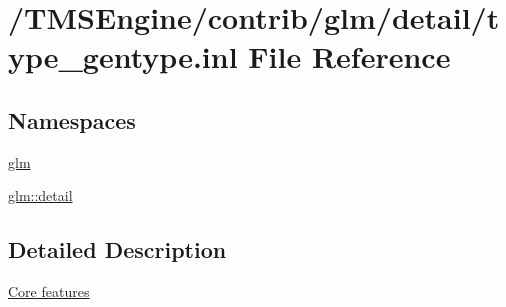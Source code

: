 \hypertarget{type__gentype_8inl}{}\section{/\+T\+M\+S\+Engine/contrib/glm/detail/type\+\_\+gentype.inl File Reference}
\label{type__gentype_8inl}
\subsection*{Namespaces}
\begin{DoxyCompactItemize}
\item 
 \hyperlink{namespaceglm}{glm}
\item 
 \hyperlink{namespaceglm_1_1detail}{glm\+::detail}
\end{DoxyCompactItemize}


\subsection{Detailed Description}
\hyperlink{group__core}{Core features} 